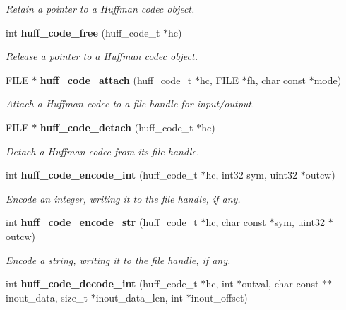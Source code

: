 \begin{CompactItemize}
\begin{CompactList}\small\item\em Retain a pointer to a Huffman codec object. \item\end{CompactList}\item 
int {\bf huff\_\-code\_\-free} (huff\_\-code\_\-t $\ast$hc)\label{huff__code_8h_e11af2c92c2eb047cb926dd97789eea2}

\begin{CompactList}\small\item\em Release a pointer to a Huffman codec object. \item\end{CompactList}\item 
FILE $\ast$ {\bf huff\_\-code\_\-attach} (huff\_\-code\_\-t $\ast$hc, FILE $\ast$fh, char const $\ast$mode)\label{huff__code_8h_967b15414f2a48342cdf8dd6488a934a}

\begin{CompactList}\small\item\em Attach a Huffman codec to a file handle for input/output. \item\end{CompactList}\item 
FILE $\ast$ {\bf huff\_\-code\_\-detach} (huff\_\-code\_\-t $\ast$hc)\label{huff__code_8h_197d8985c1f32747b5b1b116b246ccc2}

\begin{CompactList}\small\item\em Detach a Huffman codec from its file handle. \item\end{CompactList}\item 
int {\bf huff\_\-code\_\-encode\_\-int} (huff\_\-code\_\-t $\ast$hc, int32 sym, uint32 $\ast$outcw)\label{huff__code_8h_2813bf45e26e8af3d3bb37c4821a3cc4}

\begin{CompactList}\small\item\em Encode an integer, writing it to the file handle, if any. \item\end{CompactList}\item 
int {\bf huff\_\-code\_\-encode\_\-str} (huff\_\-code\_\-t $\ast$hc, char const $\ast$sym, uint32 $\ast$outcw)\label{huff__code_8h_2312cc30520a54f4e46a92fefa82fe7d}

\begin{CompactList}\small\item\em Encode a string, writing it to the file handle, if any. \item\end{CompactList}\item 
int {\bf huff\_\-code\_\-decode\_\-int} (huff\_\-code\_\-t $\ast$hc, int $\ast$outval, char const $\ast$$\ast$inout\_\-data, size\_\-t $\ast$inout\_\-data\_\-len, int $\ast$inout\_\-offset)\label{huff__code_8h_a1eb2eb1261251af7875d022611e3b8d}


\end{CompactItemize}
